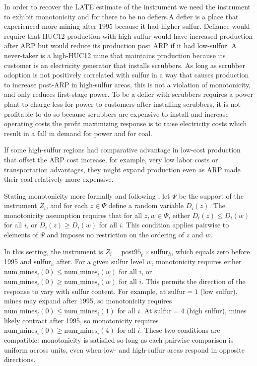 \documentclass{article}
\begin{document}
In order to recover the LATE estimate of the instrument we need the instrument to exhibit monotonicity and for there to be no defiers.A defier is a place that experienced more mining after 1995 because it had higher sulfur. Defiance would require that HUC12 production with high-sulfur would have increased production after ARP but would reduce its production post ARP if it had low-sulfur. A never-taker is a high-HUC12 mine that maintains production because its customer is an electricity generator that installs scrubbers. As long as scrubber adoption is not positively correlated with sulfur in a way that causes production to increase post-ARP in high-sulfur areas, this is not a violation of monotonicity, and only reduces first-stage power. To be a defier with scrubbers requires a power plant to charge less for power to customers after installing scrubbers, it is not profitable to do so because scrubbers are expensive to install and increase operating costs the profit maximizing response is to raise electricity costs which result in a fall in demand for power and for coal.

If some high-sulfur regions had comparative advantage in low-cost production that offset the ARP cost increase, for example, very low labor costs or transportation advantages, they might expand production even as ARP made their coal relatively more expensive.

Stating monotonicity more formally and following \cite{angrist1994identification}, let $\Psi$ be the support of the instrument $Z_i$, and for each $z \in \Psi$ define a random variable $D_i(z)$. The monotonicity assumption requires that for all $z, w \in \Psi$, either $D_i(z) \leq D_i(w)$ for all $i$, or $D_i(z) \geq D_i(w)$ for all $i$. This condition applies pairwise to elements of $\Psi$ and imposes no restriction on the ordering of $z$ and $w$.

In this setting, the instrument is $Z_i = \text{post95}_t \times \text{sulfur}_h$, which equals zero before 1995 and $\text{sulfur}_h$ after. For a given sulfur level $w$, monotonicity requires either $\text{num_mines}_i(0) \leq \text{num_mines}_i(w)$ for all $i$, or $\text{num_mines}_i(0) \geq \text{num_mines}_i(w)$ for all $i$. This permits the direction of the response to vary with sulfur content. For example, at $\text{sulfur} = 1$ (low sulfur), mines may expand after 1995, so monotonicity requires $\text{num_mines}_i(0) \leq \text{num_mines}_i(1)$ for all $i$. At $\text{sulfur} = 4$ (high sulfur), mines likely contract after 1995, so monotonicity requires $\text{num_mines}_i(0) \geq \text{num_mines}_i(4)$ for all $i$. These two conditions are compatible: monotonicity is satisfied so long as each pairwise comparison is uniform across units, even when low- and high-sulfur areas respond in opposite directions.
\end{document}
